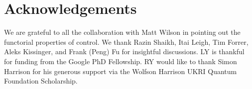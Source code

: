 \section{Acknowledgements}
We are grateful to all the collaboration with Matt Wilson in pointing out the functorial properties of control. We thank Razin Shaikh, Itai Leigh, Tim Forrer, Aleks Kissinger, and Frank (Peng) Fu for insightful discussions.
LY is thankful for funding from the Google PhD Fellowship.
RY would like to thank Simon Harrison for his generous support via the Wolfson Harrison UKRI Quantum Foundation Scholarship.